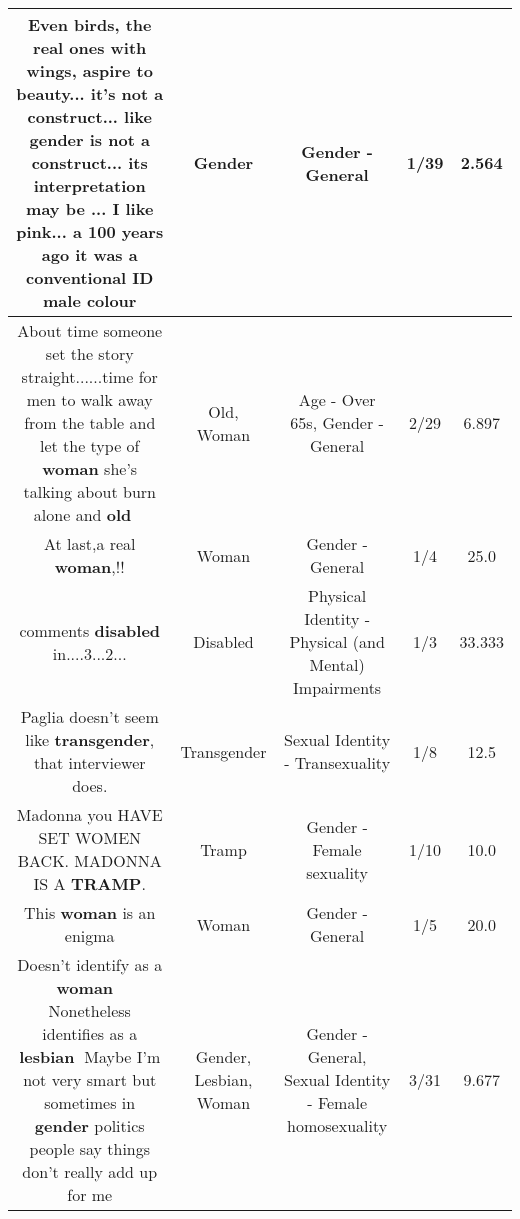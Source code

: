 \documentclass[11pt]{article}
\newlength\mylength
\begin{document}
\begin{center}
\begin{longtable}{|C{.65\mylength}|C{.30\mylength}|C{.12\mylength}|C{.12\mylength}|C{.12\mylength}|}
  \small Even birds, the real ones with wings, aspire to beauty... it's not a construct... like \textbf{gender} is not a construct... its interpretation may be ... I like pink... a 100 years ago it was a conventional ID male colour\normalsize   & Gender & Gender - General & 1/39 & 2.564 \\  \hline
  \small About time someone set the story straight......time for men to walk away from the table and let the type of \textbf{woman} she's talking about burn alone and \textbf{old} 🤘🏻\normalsize   & Old, Woman & Age - Over 65s, Gender - General & 2/29 & 6.897 \\  \hline
  \small At last,a real \textbf{woman},!!\normalsize   & Woman & Gender - General & 1/4 & 25.0 \\  \hline
  \small comments \textbf{disabled} in....3...2...\normalsize   & Disabled & Physical Identity - Physical (and Mental) Impairments & 1/3 & 33.333 \\  \hline
  \small Paglia doesn't seem like \textbf{transgender}, that interviewer does.\normalsize   & Transgender & Sexual Identity - Transexuality & 1/8 & 12.5 \\  \hline
  \small Madonna you HAVE SET WOMEN BACK.  MADONNA IS A \textbf{TRAMP}.\normalsize   & Tramp & Gender - Female sexuality & 1/10 & 10.0 \\  \hline
  \small This \textbf{woman} is an enigma\normalsize   & Woman & Gender - General & 1/5 & 20.0 \\  \hline
  \small Doesn't identify as a \textbf{woman} 🤔Nonetheless identifies as a \textbf{lesbian} 🤔Maybe I'm not very smart but sometimes in \textbf{gender} politics people say things don't really add up for me\normalsize   & Gender, Lesbian, Woman & Gender - General, Sexual Identity - Female homosexuality & 3/31 & 9.677 \\  \hline

\end{longtable}
\end{center}
\end{document}
